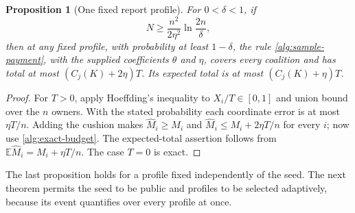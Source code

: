 \documentclass[11pt]{article}
\newtheorem{proposition}[theorem]{Proposition}
\theoremstyle{definition}\newtheorem{definition}[theorem]{Definition}
\theoremstyle{remark}\newtheorem{remark}[theorem]{Remark}
\newcommand{\E}{\mathbb E}
\begin{document}
\begin{proposition}[One fixed report profile]\label{alg:pointwise}
For $0<\delta<1$, if
\[
 N\ge \frac{n^2}{2\eta^2}\ln\frac{2n}{\delta},
\]
then at any fixed profile, with probability at least $1-\delta$, the rule
\eqref{alg:sample-payment}, with the supplied coefficients $\theta$ and $\eta$,
covers every coalition and has total at most
$(C_j(K)+2\eta)T$.  Its expected total is at most $(C_j(K)+\eta)T$.
\end{proposition}
\begin{proof}
For $T>0$, apply Hoeffding's inequality to $X_i/T\in[0,1]$ and union bound
over the $n$ owners.  With the stated probability each coordinate error is
at most $\eta T/n$.  Adding the cushion makes $\widehat M_i\ge M_i$ and
$\widehat M_i\le M_i+2\eta T/n$ for every $i$; now use
\eqref{alg:exact-budget}.  The expected-total assertion follows from
$\E\widehat M_i=M_i+\eta T/n$.  The case $T=0$ is exact.
\end{proof}
The last proposition holds for a profile fixed independently of the seed.
The next theorem permits the seed to be public and profiles to be selected
adaptively, because its event quantifies over every profile at once.
\end{document}
